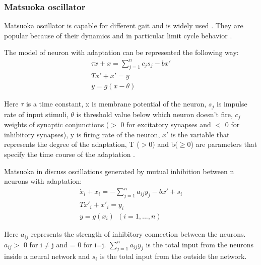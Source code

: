 \documentclass[12pt,a4paper]{report}
\begin{document}
			\subsubsection{Matsuoka oscillator}
				Matsuoka oscillator is capable for different gait and is widely used \cite{wright2014intelligent}. They are popular because of their dynamics and in particular limit cycle behavior \cite{matsuoka1985sustained}.
				
				The model of neuron with adaptation can be represented the following way:
				\begin{equation}\label{eq:Mats1}
					\begin{split}
						\tau \dot{x} + x = \sum^n_{j = 1} c_j s_j - b x \prime\\
						T \dot{x} \prime  + x \prime = y\\
						y = g(x - \theta)
					\end{split}
				\end{equation}
				
				Here $\tau$ is a time constant, x is membrane potential of the neuron, $s_j$ is impulse rate of input stimuli, $\theta$ is threshold value below which neuron doesn't fire, $c_j$ weights of synaptic conjunctions ($>$ 0 for excitatory synapses and $<$ 0 for inhibitory synapses), y is firing rate of the neuron, $x \prime$ is the variable that represents the degree of the adaptation, T ($>$0) and b($\geq 0$) are parameters that specify the time course of the adaptation \cite{matsuoka1985sustained}.
				
				Matsuoka in \cite{matsuoka1985sustained} discuss oscillations generated by mutual inhibition between n neurons with adaptation:
				\begin{equation}\label{eq:Mats2}
					\begin{split}
						\dot{x}_i + x_i = - \sum^n_{j = 1} a_{ij} y_j - b x \prime + s_i\\
						T \dot{x} \prime _i  + x \prime _i= y_i\\
						y = g(x_i)\ \ (i = 1,...,n) 
					\end{split}
				\end{equation}
				
				Here $a_{ij}$ represents the strength of inhibitory connection between the neurons. $a_{ij} >$ 0 for i$\neq$j and = 0 for i=j. $\sum^n_{j = 1} a_{ij} y_j $ is the total input from the neurons inside a neural network and $s_{i}$ is the total input from the outside the network. 
				
\end{document}
